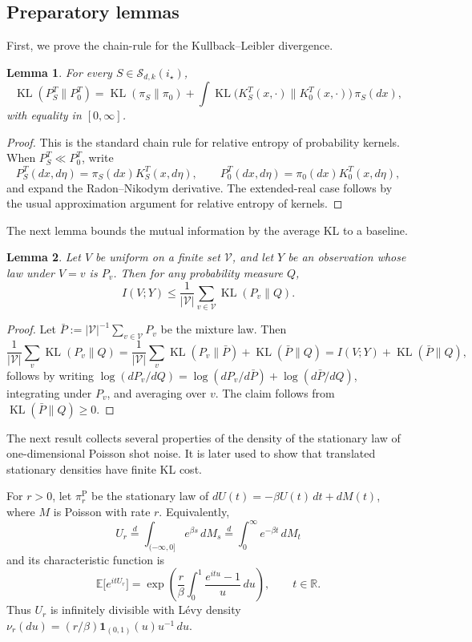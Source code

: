 \documentclass{article}
\newtheorem{lemma}{Lemma}[section]
\newcommand{\KL}{\operatorname{KL}}
\newcommand{\R}{\mathbb{R}}
\newcommand{\E}{\mathbb{E}}
\begin{document}
\subsection{Preparatory lemmas}\label{app:lower-prelim}
First, we prove the chain-rule for the Kullback--Leibler divergence.
\begin{lemma}\label{lem:app-chain}
For every $S\in\mathcal S_{d,k}(i_\star)$,
\[
\KL(P_S^T\|P_0^T)
=
\KL(\pi_S\|\pi_0)
+
\int \KL\!\bigl(K_S^T(x,\cdot)\|K_0^T(x,\cdot)\bigr)\,\pi_S(dx),
\]
with equality in $[0,\infty]$.
\end{lemma}

\begin{proof}
This is the standard chain rule for relative entropy of probability kernels. When $P_S^T\ll P_0^T$, write
\[
P_S^T(dx,d\eta)=\pi_S(dx)K_S^T(x,d\eta),
\qquad
P_0^T(dx,d\eta)=\pi_0(dx)K_0^T(x,d\eta),
\]
and expand the Radon--Nikodym derivative. The extended-real case follows by the usual approximation argument for relative entropy of
kernels.
\end{proof}
The next lemma bounds the mutual information by the average KL to a baseline.
\begin{lemma}
\label{lem:app-mi-baseline}
Let $V$ be uniform on a finite set $\mathcal V$, and let $Y$ be an
observation whose law under $V=v$ is $P_v$. Then for any probability
measure $Q$,
\[
I(V;Y)\le \frac{1}{|\mathcal V|}\sum_{v\in\mathcal V}\KL(P_v\|Q).
\]
\end{lemma}

\begin{proof}
Let $\bar P:=|\mathcal V|^{-1}\sum_{v\in\mathcal V}P_v$ be the mixture law.
Then
\[
\frac1{|\mathcal V|}\sum_v \KL(P_v\|Q)
=\frac1{|\mathcal V|}\sum_v \KL(P_v\|\bar P)+\KL(\bar P\|Q)
=I(V;Y)+\KL(\bar P\|Q),
\]
follows by writing
$\log(dP_v/dQ)=\log(dP_v/d\bar P)+\log(d\bar P/dQ)$,
integrating under $P_v$, and averaging over $v$. The claim follows from
$\KL(\bar P\|Q)\ge 0$.
\end{proof}



The next result collects several properties of the density of the stationary law of
one-dimensional Poisson shot noise. It is later used to show that translated stationary densities have finite KL cost.

For $r>0$, let $\pi_r^{\mathrm P}$ be the stationary law of
$dU(t)=-\beta U(t)\,dt+dM(t)$, where $M$ is Poisson with rate $r$.
Equivalently,
\[
U_r\stackrel{d}{=}\int_{(-\infty,0]} e^{\beta s}\,dM_s
\stackrel{d}{=}\int_0^\infty e^{-\beta t}\,dM_t
\]
and its characteristic function is
\begin{equation}\label{eq:app-1d-CF}
\E\bigl[e^{itU_r}\bigr]
=\exp\!\left(\frac{r}{\beta}\int_0^1\frac{e^{itu}-1}{u}\,du\right),
\qquad t\in\R.
\end{equation}
Thus $U_r$ is infinitely divisible with L\'evy density $\nu_r(du)=(r/\beta)\mathbf1_{(0,1)}(u)u^{-1}\,du$.
\end{document}
